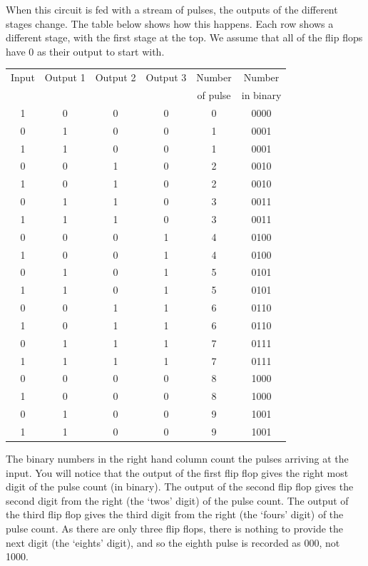 When this circuit is fed with a stream of pulses, the outputs of the different stages change.  The table below shows how this happens.  Each row shows a different stage, with the first stage at the top.  We assume that all of the flip flops have 0 as their output to start with.

\begin{center} \begin{tabular}{|c|c|c|c|c|c|} \hline
Input & Output 1 & Output 2 & Output 3 & Number & Number \\
 &  &  &  & of pulse & in binary \\ \hline
1 & 0 & 0 & 0 & 0 & 0000 \\ \hline
0 & 1 & 0 & 0 & 1 & 0001 \\ \hline
1 & 1 & 0 & 0 & 1 & 0001 \\ \hline
0 & 0 & 1 & 0 & 2 & 0010 \\ \hline
1 & 0 & 1 & 0 & 2 & 0010 \\ \hline
0 & 1 & 1 & 0 & 3 & 0011 \\ \hline
1 & 1 & 1 & 0 & 3 & 0011 \\ \hline
0 & 0 & 0 & 1 & 4 & 0100 \\ \hline
1 & 0 & 0 & 1 & 4 & 0100 \\ \hline
0 & 1 & 0 & 1 & 5 & 0101 \\ \hline
1 & 1 & 0 & 1 & 5 & 0101 \\ \hline
0 & 0 & 1 & 1 & 6 & 0110 \\ \hline
1 & 0 & 1 & 1 & 6 & 0110 \\ \hline
0 & 1 & 1 & 1 & 7 & 0111 \\ \hline
1 & 1 & 1 & 1 & 7 & 0111 \\ \hline
0 & 0 & 0 & 0 & 8 & 1000 \\ \hline
1 & 0 & 0 & 0 & 8 & 1000 \\ \hline
0 & 1 & 0 & 0 & 9 & 1001 \\ \hline
1 & 1 & 0 & 0 & 9 & 1001 \\ \hline \end{tabular} \end{center}
               
The binary numbers in the right hand column count the pulses arriving at the input.  You will notice that the output of the first flip flop gives the right most digit of the pulse count (in binary).  The output of the second flip flop gives the second digit from the right (the `twos' digit) of the pulse count.  The output of the third flip flop gives the third digit from the right (the `fours' digit) of the pulse count.  As there are only three flip flops, there is nothing to provide the next digit (the `eights' digit), and so the eighth pulse is recorded as 000, not 1000.

